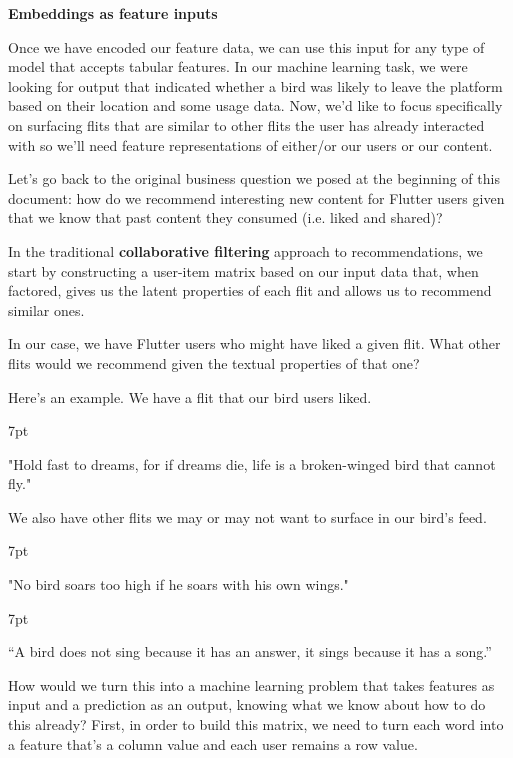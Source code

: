 \documentclass[11pt, table]{diazessay} %
\newenvironment{formal}{%
  \def\FrameCommand{%
	\hspace{1pt}%
	{\color{w_lightblue}\vrule width 2pt}%
	{\color{formalshade}\vrule width 4pt}%
	\colorbox{formalshade}%
  }%
  \MakeFramed{\advance\hsize-\width\FrameRestore}%
  \noindent\hspace{-4.55pt}%
  \begin{adjustwidth}{}{7pt}%
  \vspace{2pt}\vspace{2pt}%
}
{%
  \vspace{2pt}\end{adjustwidth}\endMakeFramed%
}
\begin{document}
\begin{sloppypar}
\textbf{Embeddings as feature inputs}

Once we have encoded our feature data, we can use this input for any type of model that accepts tabular features.  In our machine learning task, we were looking for output that indicated whether a bird was likely to leave the platform based on their location and some usage data. Now, we'd like to focus specifically on surfacing flits that are similar to other flits the user has already interacted with so we'll need feature representations of either/or our users or our content.

Let's go back to the original business question we posed at the beginning of this document: how do we recommend interesting new content for Flutter users given that we know that past content they consumed (i.e. liked and shared)?

In the traditional \textbf{collaborative filtering} approach to recommendations, we start by constructing a user-item matrix based on our input data that, when factored, gives us the latent properties of each flit and allows us to recommend similar ones.

In our case, we have Flutter users who might have liked a given flit. What other flits would we recommend given the textual properties of that one?

Here’s an example.  We have a flit that our bird users liked.

\begin{formal}
	"Hold fast to dreams, for if dreams die, life is a broken-winged bird that cannot fly."
\end{formal}

We also have other flits we may or may not want to surface in our bird's feed.

\begin{formal}
"No bird soars too high if he soars with his own wings."
\end{formal}

\begin{formal}
“A bird does not sing because it has an answer, it sings because it has a song.”
\end{formal}

How would we turn this into a machine learning problem that takes features as input and a prediction as an output, knowing what we know about how to do this already?  First, in order to build this matrix, we need to turn each word into a feature that's a column value and each user remains a row value.



\end{sloppypar}
\end{document}
